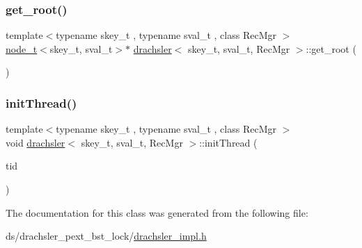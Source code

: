 \mbox{\label{classdrachsler_a4b411071d0df1797510d590a034a66d0}} 
\subsubsection{\texorpdfstring{get\+\_\+root()}{get\_root()}}
{\footnotesize\ttfamily template$<$typename skey\+\_\+t , typename sval\+\_\+t , class Rec\+Mgr $>$ \\
\hyperlink{structnode__t}{node\+\_\+t}$<$skey\+\_\+t, sval\+\_\+t$>$$\ast$ \hyperlink{classdrachsler}{drachsler}$<$ skey\+\_\+t, sval\+\_\+t, Rec\+Mgr $>$\+::get\+\_\+root (\begin{DoxyParamCaption}{ }\end{DoxyParamCaption})\hspace{0.3cm}{\ttfamily [inline]}}

\mbox{\label{classdrachsler_a5b779dc3d1eb620b4e91189b3409ce1b}} 
\subsubsection{\texorpdfstring{init\+Thread()}{initThread()}}
{\footnotesize\ttfamily template$<$typename skey\+\_\+t , typename sval\+\_\+t , class Rec\+Mgr $>$ \\
void \hyperlink{classdrachsler}{drachsler}$<$ skey\+\_\+t, sval\+\_\+t, Rec\+Mgr $>$\+::init\+Thread (\begin{DoxyParamCaption}\item[{const int}]{tid }\end{DoxyParamCaption})\hspace{0.3cm}{\ttfamily [inline]}}



The documentation for this class was generated from the following file\+:\begin{DoxyCompactItemize}
\item 
ds/drachsler\+\_\+pext\+\_\+bst\+\_\+lock/\hyperlink{drachsler__impl_8h}{drachsler\+\_\+impl.\+h}\end{DoxyCompactItemize}

